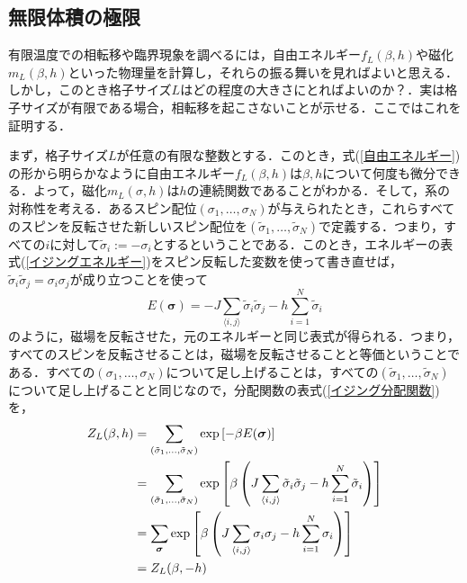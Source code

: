 \documentclass[a4paper,11pt]{jsreport}
\begin{document}
\subsection{無限体積の極限}
有限温度での相転移や臨界現象を調べるには，自由エネルギー$f_L(\beta, h)$や磁化$m_L(\beta, h)$といった物理量を計算し，それらの振る舞いを見ればよいと思える．しかし，このとき格子サイズ$L$はどの程度の大きさにとればよいのか？．実は格子サイズが有限である場合，相転移を起こさないことが示せる．ここではこれを証明する．\par
まず，格子サイズ$L$が任意の有限な整数とする．このとき，式(\ref{自由エネルギー})の形から明らかなように自由エネルギー$f_L(\beta, h)$は$\beta, h$について何度も微分できる．よって，磁化$m_L(\sigma, h)$は$h$の連続関数であることがわかる．そして，系の対称性を考える．あるスピン配位$(\sigma_1,\dots,\sigma_N)$が与えられたとき，これらすべてのスピンを反転させた新しいスピン配位を$(\tilde{\sigma}_1,\dots,\tilde{\sigma}_N)$で定義する．つまり，すべての$i$に対して$\tilde{\sigma}_i := -\sigma_i$とするということである．このとき，エネルギーの表式(\ref{イジングエネルギー})をスピン反転した変数を使って書き直せば，$\tilde{\sigma}_i \tilde{\sigma}_j = \sigma_i \sigma_j$が成り立つことを使って
\begin{equation}
  E(\bm{\sigma}) = -J \sum_{\langle i,j \rangle} \tilde{\sigma}_i \tilde{\sigma}_j -h \sum_{i=1}^{N} \tilde{\sigma}_i
\end{equation}
のように，磁場を反転させた，元のエネルギーと同じ表式が得られる．つまり，すべてのスピンを反転させることは，磁場を反転させることと等価ということである．すべての$(\sigma_1,\dots,\sigma_N)$について足し上げることは，すべての$(\tilde{\sigma}_1,\dots,\tilde{\sigma}_N)$について足し上げることと同じなので，分配関数の表式(\ref{イジング分配関数})を，
\begin{align}
  Z_L(\beta, h)
   & = \sum_{(\tilde{\sigma}_1,\dots,\tilde{\sigma}_N)} \exp{[-\beta E(\bm{\sigma})]} \notag                                                                                               \\
   & = \sum_{(\tilde{\sigma}_1,\dots,\tilde{\sigma}_N)} \exp{\left[ \beta\left( J \sum_{\langle i,j \rangle} \tilde{\sigma}_i \tilde{\sigma}_j -h \sum_{i=1}^{N} \tilde{\sigma}_i \right) \right]} \notag \\
   & = \sum_{\bm{\sigma}} \exp{\left[ \beta\left( J \sum_{\langle i,j \rangle} \sigma_i \sigma_j -h \sum_{i=1}^{N} \sigma_i \right) \right]} \notag                                         \\
   & = Z_L(\beta, -h)
\end{align}
\end{document}
